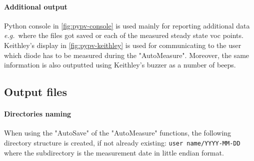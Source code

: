  \begin{figure}
 \end{figure}
 
\paragraph{Additional output}
Python console in \cref{fig:pypv-console} is used mainly for reporting additional data \textsl{e.g.}\ where the files got saved or each of the measured steady state \gls{voc} points.
Keithley's display in \cref{fig:pypv-keithley} is used for communicating to the user which diode has to be measured during the "AutoMeasure".
Moreover, the same information is also outputted using Keithley's buzzer as a number of beeps.

\subsection{Output files}
	
\paragraph{Directories naming}\label{pypv_naming_directories}
When using the "AutoSave" of the "AutoMeasure" functions, the following directory structure is created, if not already existing: \texttt{user name\-/YYYY-MM-DD} where the subdirectory is the measurement date in little endian format.

